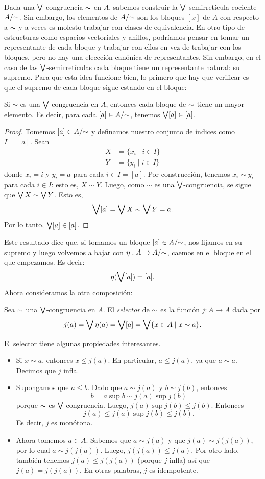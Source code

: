 Dada una $\bigvee$-congruencia ${\sim}$ en $A$, sabemos construir la
$\bigvee$-semirretícula cociente $A/{\sim}$.
Sin embargo, los elementos de $A/{\sim}$ son los bloques $[x]$ de
$A$ con respecto a ${\sim}$ y a veces es molesto trabajar con
clases de equivalencia. En otro tipo de estructuras como espacios
vectoriales y anillos, podríamos pensar en tomar un representante
de cada bloque y trabajar con ellos en vez de trabajar con los
bloques, pero no hay una eleccción canónica de representantes.
Sin embargo, en el caso de las $\bigvee$-semirretículas cada bloque
tiene un representante natural: su supremo.
Para que esta idea funcione bien, lo primero que hay que
verificar es que el supremo de cada bloque sigue estando en el
bloque:
\begin{lemma}
  Si $\sim$ es una $\bigvee$-congruencia en $A$, entonces cada
  bloque de ${\sim}$ tiene un mayor elemento.
  Es decir, para cada $[a]\in A/{\sim}$, tenemos $\bigvee[a]\in [a]$.
\end{lemma}
\begin{proof}
  Tomemos $[a]\in A/{\sim}$ y definamos nuestro conjunto de
  índices como $I=[a]$.
  Sean
  \begin{align*}
      X &= \{x_i \mid i\in I\} \\
      Y &= \{y_i \mid i\in I\}
  \end{align*}
  donde $x_i=i$ y $y_i=a$ para cada $i\in I=[a]$.
  Por construcción, tenemos $x_i\sim y_i$ para cada $i\in I$:
  esto es, $X\sim Y$.
  Luego, como $\sim$ es una $\bigvee$-congruencia, se sigue que
  $\bigvee X\sim\bigvee Y$.
  Esto es,
  \[
      \bigvee[a] = \bigvee X \sim \bigvee Y = a
  .\]
  Por lo tanto, $\bigvee [a]\in [a]$.
\end{proof}
Este resultado dice que, si tomamos un bloque $[a]\in A/{\sim}$,
nos fijamos en su supremo y luego volvemos a bajar con $\eta:A\to
A/{\sim}$, caemos en el bloque en el que empezamos.
Es decir:
\[
    \eta(\bigvee [a]) = [a]
.\]
Ahora consideramos la otra composición:
\begin{definition}
    Sea ${\sim}$ una $\bigvee$-congruencia en $A$.
    El \emph{selector} de ${\sim}$ es la función $j:A\to A$ dada por
    \[
        j(a) = \bigvee\eta(a) = \bigvee[a] = \bigvee\{x\in A \mid x\sim a\}
    .\]
\end{definition}
El selector tiene algunas propiedades interesantes.
\begin{itemize}
    \item 
    Si $x\sim a$, entonces $x\leq j(a)$.
    En particular, $a\leq j(a)$, ya que $a\sim a$.
    Decimos que $j$ infla.
    \item
    Supongamos que $a\leq b$.
    Dado que $a\sim j(a)$ y $b\sim j(b)$, entonces
    \[
        b = a\sup b \sim j(a) \sup j(b)
    \]
    porque ${\sim}$ es $\bigvee$-congruencia.
    Luego, $j(a) \sup j(b) \leq j(b)$.
    Entonces
    \[
        j(a)\leq j(a)\sup j(b) \leq j(b)
    .\]
    Es decir, $j$ es monótona.
    \item
    Ahora tomemos $a\in A$.
    Sabemos que $a\sim j(a)$ y que $j(a)\sim j(j(a))$,
    por lo cual $a\sim j(j(a))$.
    Luego, $j(j(a))\leq j(a)$.
    Por otro lado, también tenemos $j(a)\leq j(j(a))$ (porque $j$ infla) así que
    $j(a)=j(j(a))$.
    En otras palabras, $j$ es idempotente.
\end{itemize}
